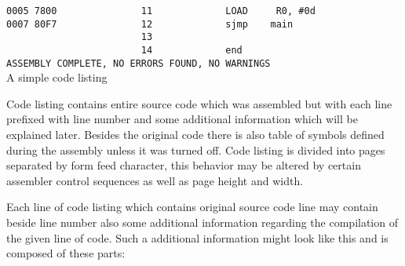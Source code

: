 {\begin{code}[h]
                        {\color{highlight_lst_address}\verb'0005'}{\color{highlight_lst_code}\verb' 7800'}{\color{highlight_lst_line}\verb'               11'}\verb'             '{\color{highlight_instruction}\verb'LOAD'}\verb'     '{\color{highlight_sfr}\verb'R0'}{\color{highlight_oper_sep}\verb','}\verb' '{\color{highlight_imm_dec}\verb'#0d'}\\
                        {\color{highlight_lst_address}\verb'0007'}{\color{highlight_lst_code}\verb' 80F7'}{\color{highlight_lst_line}\verb'               12'}\verb'             '{\color{highlight_instruction}\verb'sjmp'}\verb'    '{\color{highlight_constant}\verb'main'}\\
                        {\color{highlight_lst_line}\verb'                        13'}\\
                        {\color{highlight_lst_line}\verb'                        14'}\verb'             '{\color{highlight_directive}\verb'end'}\\
                        {\color{highlight_lst_msg}\verb'ASSEMBLY COMPLETE,'}\verb' NO ERRORS FOUND, NO WARNINGS'\\
                        \caption{A simple code listing}
                \end{code}
                Code listing contains entire source code which was assembled but with each line prefixed with line number and some additional information which will be explained later. Besides the original code there is also table of symbols defined during the assembly unless it was turned off. Code listing is divided into pages separated by form feed character, this behavior may be altered by certain assembler control sequences as well as page height and width.

                Each line of code listing which contains original source code line may contain beside line number also some additional information regarding the compilation of the given line of code. Such a additional information might look like this and is composed of these parts:

}
